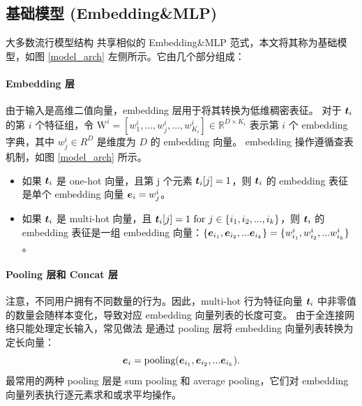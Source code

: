 \subsection{基础模型 (Embedding\&MLP)}
\label{sec:basemodel}
大多数流行模型结构 \cite{deep_crossing,widedeep,youtube:recommend} 共享相似的 Embedding\&MLP 范式，本文将其称为基础模型，如图 \ref{model_arch} 左侧所示。它由几个部分组成：
\paragraph{\textbf{Embedding 层}} 由于输入是高维二值向量，embedding 层用于将其转换为低维稠密表征。
对于 $\boldsymbol{t}_i$ 的第 $i$ 个特征组，令 $\mathrm{W}^i = [w_1^i,...,w_j^i, ..., w_{K_i}^i] \in\mathbb{R}^{D \times K_i}$ 表示第 $i$ 个 embedding 字典，其中 $w_j^i \in R^D$ 是维度为 $D$ 的 embedding 向量。
embedding 操作遵循查表机制，如图 \ref{model_arch} 所示。
\begin{itemize}
\item 如果 $\boldsymbol{t}_i$ 是 one-hot 向量，且第 j 个元素 $\boldsymbol{t}_i[j]=1$，则 $\boldsymbol{t}_i$ 的 embedding 表征是单个 embedding 向量 $\boldsymbol{e}_i = w_j^i$。
\item 如果 $\boldsymbol{t}_i$ 是 multi-hot 向量，且 $\boldsymbol{t}_i[j]=1 ~\text{for}~ j \in \{i_1, i_2, ..., i_k\} $，则 $\boldsymbol{t}_i$ 的 embedding 表征是一组 embedding 向量：$\{\boldsymbol{e}_{i_1}, \boldsymbol{e}_{i_2},...\boldsymbol{e}_{i_k}\} = \{w_{i_1}^i, w_{i_2}^i, ...w_{i_k}^i\}$。
\end{itemize}



\paragraph{\textbf{Pooling 层和 Concat 层}}
注意，不同用户拥有不同数量的行为。因此，multi-hot 行为特征向量 $\boldsymbol{t}_i$ 中非零值的数量会随样本变化，导致对应 embedding 向量列表的长度可变。
由于全连接网络只能处理定长输入，常见做法 \cite{widedeep,youtube:recommend} 是通过 pooling 层将 embedding 向量列表转换为定长向量：
\begin{equation}
\label{eq:pooling}
\boldsymbol{e}_i = \text{pooling}(\boldsymbol{e}_{i_1}, \boldsymbol{e}_{i_2},...\boldsymbol{e}_{i_k}).	
\end{equation}
最常用的两种 pooling 层是 sum pooling 和 average pooling，它们对 embedding 向量列表执行逐元素求和或求平均操作。

